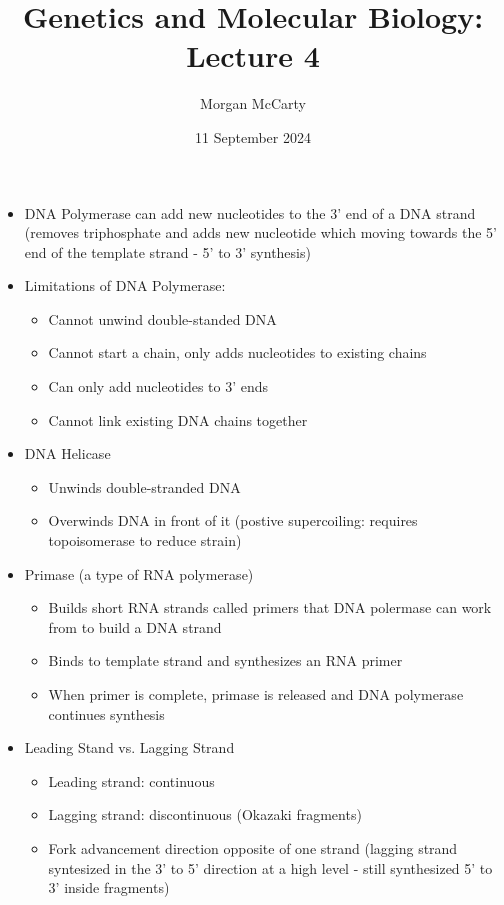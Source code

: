 \documentclass[12pt]{article}
\title{
    Genetics and Molecular Biology: Lecture 4}
\author{Morgan McCarty}
\date{11 September 2024}
\begin{document}
    \maketitle
    \begin{itemize}
        \item DNA Polymerase can add new nucleotides to the 3' end of a DNA strand (removes triphosphate and adds new nucleotide which moving towards the 5' end of the template strand - 5' to 3' synthesis)
        \item Limitations of DNA Polymerase:
        \begin{itemize}
            \item Cannot unwind double-standed DNA
            \item Cannot start a chain, only adds nucleotides to existing chains
            \item Can only add nucleotides to 3' ends
            \item Cannot link existing DNA chains together
        \end{itemize}
        \item DNA Helicase
        \begin{itemize}
            \item Unwinds double-stranded DNA
            \item Overwinds DNA in front of it (postive supercoiling: requires topoisomerase to reduce strain)
        \end{itemize}
        \item Primase (a type of RNA polymerase)
        \begin{itemize}
            \item Builds short RNA strands called primers that DNA polermase can work from to build a DNA strand
            \item Binds to template strand and synthesizes an RNA primer
            \item When primer is complete, primase is released and DNA polymerase continues synthesis
        \end{itemize}
        \item Leading Stand vs. Lagging Strand
        \begin{itemize}
            \item Leading strand: continuous
            \item Lagging strand: discontinuous (Okazaki fragments)
            \item Fork advancement direction opposite of one strand (lagging strand syntesized in the 3' to 5' direction at a high level - still synthesized 5' to 3' inside fragments)

\end{itemize}
\end{itemize}
\end{document}
